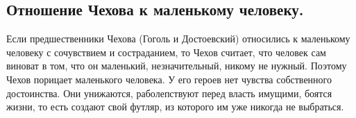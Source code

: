 \documentclass{article}
\begin{document}
\subsection{Отношение Чехова к маленькому человеку.}
Если предшественники Чехова (Гоголь и Достоевский) относились к маленькому человеку с сочувствием и состраданием, то
Чехов считает, что человек сам виноват в том, что он маленький, незначительный, никому не нужный. Поэтому Чехов
порицает маленького человека. У его героев нет чувства собственного достоинства. Они унижаются, раболепствуют перед
власть имущими, боятся жизни, то есть создают свой футляр, из которого им уже никогда не выбраться.
\end{document}
